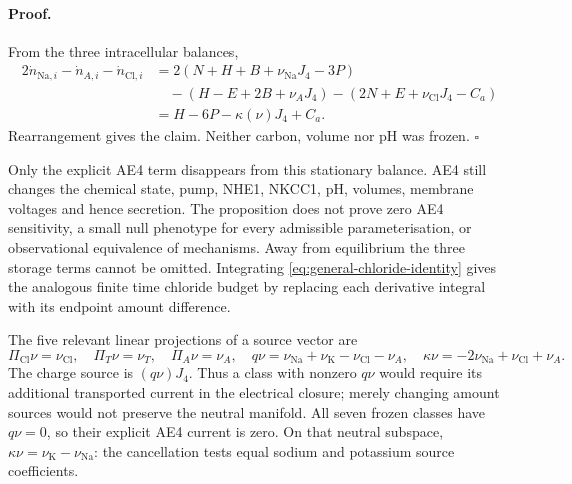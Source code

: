 \paragraph{Proof.}
From the three intracellular balances,
\begin{align*}
 2\dot n_{\mathrm{Na},i}-\dot n_{A,i}-\dot n_{\mathrm{Cl},i}
 &=2(N+H+B+\nu_{\mathrm{Na}}J_4-3P)\\
 &\quad -(H-E+2B+\nu_AJ_4)
             -(2N+E+\nu_{\mathrm{Cl}}J_4-C_a)\\
 &=H-6P-\kappa(\nu)J_4+C_a.
\end{align*}
Rearrangement gives the claim.  Neither carbon, volume nor pH was frozen.
$\square$

Only the explicit AE4 term disappears from this stationary balance.
AE4 still changes the chemical state, pump, NHE1, NKCC1, pH, volumes,
membrane voltages and hence secretion.  The proposition does not prove
zero AE4 sensitivity, a small null phenotype for every admissible
parameterisation, or observational equivalence of mechanisms.  Away from
equilibrium the three storage terms cannot be omitted.  Integrating
\eqref{eq:general-chloride-identity} gives the analogous finite time
chloride budget by replacing each derivative integral with its endpoint
amount difference.

The five relevant linear projections of a source vector are
\[
 \Pi_{\mathrm{Cl}}\nu=\nu_{\mathrm{Cl}},\quad
 \Pi_T\nu=\nu_T,\quad \Pi_A\nu=\nu_A,\quad
 q\nu=\nu_{\mathrm{Na}}+\nu_{\mathrm K}-\nu_{\mathrm{Cl}}-\nu_A,
 \quad \kappa\nu=-2\nu_{\mathrm{Na}}+\nu_{\mathrm{Cl}}+\nu_A.
\]
The charge source is $(q\nu)J_4$.  Thus a class with nonzero $q\nu$ would
require its additional transported current in the electrical closure;
merely changing amount sources would not preserve the neutral manifold.
All seven frozen classes have $q\nu=0$, so their explicit AE4 current is
zero.  On that neutral subspace,
$\kappa\nu=\nu_{\mathrm K}-\nu_{\mathrm{Na}}$: the cancellation tests
equal sodium and potassium source coefficients.

